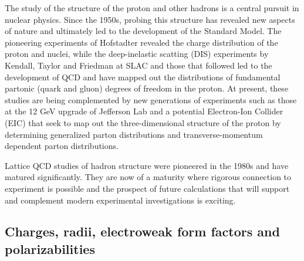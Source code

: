 
The study of the structure of the proton and other hadrons is a central pursuit in nuclear physics. Since the 1950s, probing this structure has revealed new aspects of nature and ultimately led to the development of the Standard Model. The pioneering experiments of Hofstadter revealed the charge distribution of the proton and nuclei, while the deep-inelastic scatting (DIS) experiments by Kendall, Taylor and Friedman at SLAC and those that followed led to the development of QCD and have mapped out  the distributions of fundamental partonic (quark and gluon) degrees of freedom in the proton. At present, these studies are being complemented by new generations of experiments such as those at the 12 GeV upgrade of Jefferson Lab and a potential Electron-Ion Collider (EIC) that seek to map out the three-dimensional structure of the proton by determining generalized parton distributions and transverse-momentum dependent parton distributions. 

Lattice QCD studies of hadron structure were pioneered in the 1980s and have matured significantly. They are now of a maturity where  rigorous connection to experiment is possible and the prospect of future calculations that will support and complement modern experimental investigations is exciting.


\subsection{Charges, radii,  electroweak form factors and polarizabilities}

%
%
%

